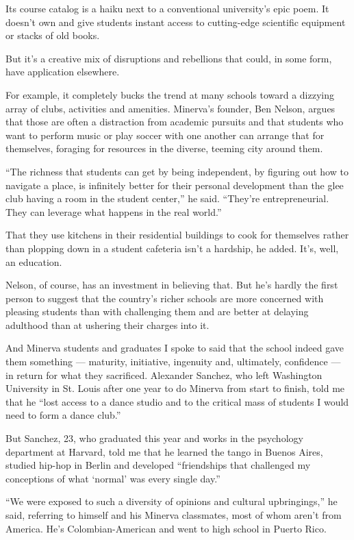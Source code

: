 Its course catalog is a haiku next to a conventional university's epic
poem. It doesn't own and give students instant access to cutting-edge
scientific equipment or stacks of old books.

But it's a creative mix of disruptions and rebellions that could, in
some form, have application elsewhere.

For example, it completely bucks the trend at many schools toward a
dizzying array of clubs, activities and amenities. Minerva's founder,
Ben Nelson, argues that those are often a distraction from academic
pursuits and that students who want to perform music or play soccer with
one another can arrange that for themselves, foraging for resources in
the diverse, teeming city around them.

``The richness that students can get by being independent, by figuring
out how to navigate a place, is infinitely better for their personal
development than the glee club having a room in the student center,'' he
said. ``They're entrepreneurial. They can leverage what happens in the
real world.''

That they use kitchens in their residential buildings to cook for
themselves rather than plopping down in a student cafeteria isn't a
hardship, he added. It's, well, an education.

Nelson, of course, has an investment in believing that. But he's hardly
the first person to suggest that the country's richer schools are more
concerned with pleasing students than with challenging them and are
better at delaying adulthood than at ushering their charges into it.

And Minerva students and graduates I spoke to said that the school
indeed gave them something --- maturity, initiative, ingenuity and,
ultimately, confidence --- in return for what they sacrificed. Alexander
Sanchez, who left Washington University in St. Louis after one year to
do Minerva from start to finish, told me that he ``lost access to a
dance studio and to the critical mass of students I would need to form a
dance club.''

But Sanchez, 23, who graduated this year and works in the psychology
department at Harvard, told me that he learned the tango in Buenos
Aires, studied hip-hop in Berlin and developed ``friendships that
challenged my conceptions of what `normal' was every single day.''

``We were exposed to such a diversity of opinions and cultural
upbringings,'' he said, referring to himself and his Minerva classmates,
most of whom aren't from America. He's Colombian-American and went to
high school in Puerto Rico.

